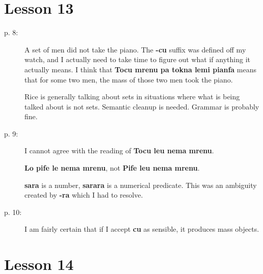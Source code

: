 \documentclass[12pt]{article}
\begin{document}
\section{Lesson 13}

\begin{description}

\item[p. 8:]   A set of men did not take the piano.  The {\bf -cu} suffix was defined off my watch, and I actually need to take time to figure out what if anything it actually means.  I think that {\bf Tocu mrenu pa tokna lemi pianfa} means that for some two men, the mass of those two men took the piano.

Rice is generally talking about sets in situations where what is being talked about is not sets.  Semantic cleanup is needed.  Grammar is probably fine.

\item[p. 9:]  I cannot agree with the reading of {\bf Tocu leu nema mrenu}.

{\bf Lo pife le nema mrenu}, not {\bf Pife leu nema mrenu}.

{\bf sara} is a number, {\bf sarara} is a numerical predicate.  This was an ambiguity created by {\bf -ra} which I had to resolve.

\item[p. 10:]  I am fairly certain that if I accept {\bf cu} as sensible, it produces mass objects.



\end{description}

\section{Lesson 14}
\end{document}
